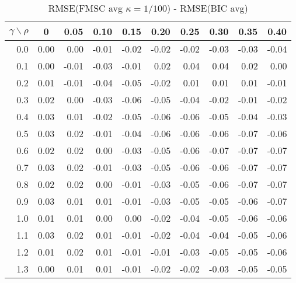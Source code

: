\documentclass[12pt]{article}
\begin{document}
%
\begin{table}[!tbp]
\caption{RMSE(FMSC avg $\kappa = 1/100$) - RMSE(BIC avg)}
 \begin{center}
 \begin{tabular}{r|rrrrrrrrr}\hline\hline
\multicolumn{1}{c|}{$\gamma\backslash\rho$}&\multicolumn{1}{c}{0}&\multicolumn{1}{c}{0.05}&\multicolumn{1}{c}{0.10}&\multicolumn{1}{c}{0.15}&\multicolumn{1}{c}{0.20}&\multicolumn{1}{c}{0.25}&\multicolumn{1}{c}{0.30}&\multicolumn{1}{c}{0.35}&\multicolumn{1}{c}{0.40}\tabularnewline
\hline

0.0&0.00& 0.00&-0.01&-0.02&-0.02&-0.02&-0.03&-0.03&-0.04\tabularnewline
0.1&0.00&-0.01&-0.03&-0.01& 0.02& 0.04& 0.04& 0.02& 0.00\tabularnewline
0.2&0.01&-0.01&-0.04&-0.05&-0.02& 0.01& 0.01& 0.01&-0.01\tabularnewline
0.3&0.02& 0.00&-0.03&-0.06&-0.05&-0.04&-0.02&-0.01&-0.02\tabularnewline
0.4&0.03& 0.01&-0.02&-0.05&-0.06&-0.06&-0.05&-0.04&-0.03\tabularnewline
0.5&0.03& 0.02&-0.01&-0.04&-0.06&-0.06&-0.06&-0.07&-0.06\tabularnewline
0.6&0.02& 0.02& 0.00&-0.03&-0.05&-0.06&-0.07&-0.07&-0.07\tabularnewline
0.7&0.03& 0.02&-0.01&-0.03&-0.05&-0.06&-0.06&-0.07&-0.07\tabularnewline
0.8&0.02& 0.02& 0.00&-0.01&-0.03&-0.05&-0.06&-0.07&-0.07\tabularnewline
0.9&0.03& 0.01& 0.01&-0.01&-0.03&-0.05&-0.05&-0.06&-0.07\tabularnewline
1.0&0.01& 0.01& 0.00& 0.00&-0.02&-0.04&-0.05&-0.06&-0.06\tabularnewline
1.1&0.03& 0.02& 0.01&-0.01&-0.02&-0.04&-0.04&-0.05&-0.06\tabularnewline
1.2&0.01& 0.02& 0.01&-0.01&-0.01&-0.03&-0.05&-0.05&-0.06\tabularnewline
1.3&0.00& 0.01& 0.01&-0.01&-0.02&-0.02&-0.03&-0.05&-0.05\tabularnewline
\hline
\end{tabular}

\end{center}

\end{table}

%
\end{document}
